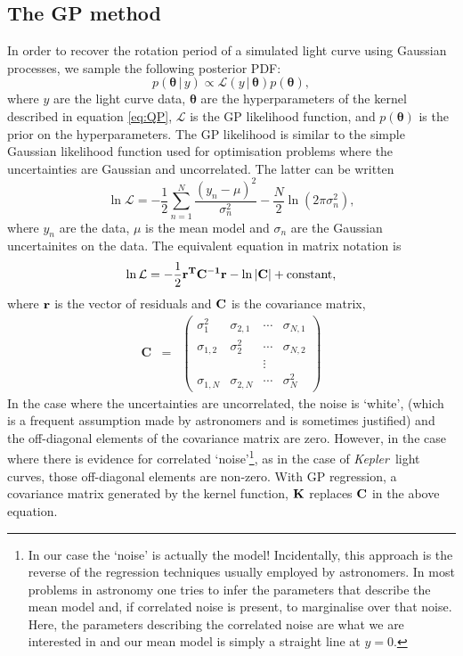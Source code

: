 \documentclass[useAMS, usenatbib, preprint, 12pt]{aastex}
\newcommand{\Kepler}{{\it Kepler}}
\begin{document}
\subsection{The GP method}

In order to recover the rotation period of a simulated light curve using
Gaussian processes, we sample the following posterior PDF:
\begin{equation}
p({\bm \theta}\,|\,y) \propto \mathcal L(y\,|\,{\bm \theta}) p({\bm \theta}),
\end{equation}
\label{eq:posterior}
where $y$ are the light curve data, $\bm \theta$ are the hyperparameters
of the kernel described in equation \ref{eq:QP}, $\mathcal L$ is the
GP likelihood function, and $p({\bm \theta})$ is the prior on the
hyperparameters.  The GP likelihood is similar to the simple Gaussian likelihood
function used for optimisation problems where the uncertainties are
Gaussian and uncorrelated. The latter can be written
\begin{equation}
\ln \mathcal{L} = -\frac{1}{2}\sum_{n=1}^N\frac{(y_n-\mu)^2}{\sigma_n^2}
    - \frac{N}{2}\ln(2\pi\sigma_n^2),
\end{equation}
\label{eq:chi2}
where $y_n$ are the data, $\mu$ is the mean model and $\sigma_n$ are the
Gaussian uncertainites on the data.
The equivalent equation in matrix notation is
\begin{equation}
\ln \mathcal{L} = -\frac{1}{2}\bf{r}^T\bf{C}^{-1}\bf{r}-\ln|\bf{C}|
    + \mathrm{constant},
\end{equation}
\label{eq:lhf1}
where $\bf{r}$ is the vector of residuals and $\bf{C}$ is the covariance
matrix,
\begin{eqnarray}
	\mathbf{C} &=& \left (\begin{array}{cccc}
	\sigma^2_1 & \sigma_{2, 1} & \cdots & \sigma_{N, 1} \\
	\sigma_{1, 2} & \sigma^2_2 & \cdots & \sigma_{N, 2} \\
    && \vdots & \\
	\sigma_{1, N} & \sigma_{2, N} & \cdots & \sigma^2_N
\end{array}\right )
\end{eqnarray}
In the case where the uncertainties are uncorrelated, the noise is `white',
(which is a frequent assumption made by astronomers and is sometimes
justified) and the off-diagonal elements of the covariance matrix are zero.
However, in the case where there is evidence for correlated
`noise'\footnote{In our case the `noise' is actually the model!  Incidentally, this approach is the reverse of the regression techniques
usually employed by astronomers.
In most problems in astronomy one tries to infer the parameters that describe
the mean model and, if correlated noise is present, to marginalise over that
noise.
Here, the parameters describing the correlated noise are what we are
interested in and our mean model is simply a straight line at $y=0$.}, as in the
case of \Kepler\ light curves, those off-diagonal elements are non-zero.
With GP regression, a covariance matrix generated by the kernel function,
${\bf K}$ replaces ${\bf C}$ in the above equation.
\end{document}
